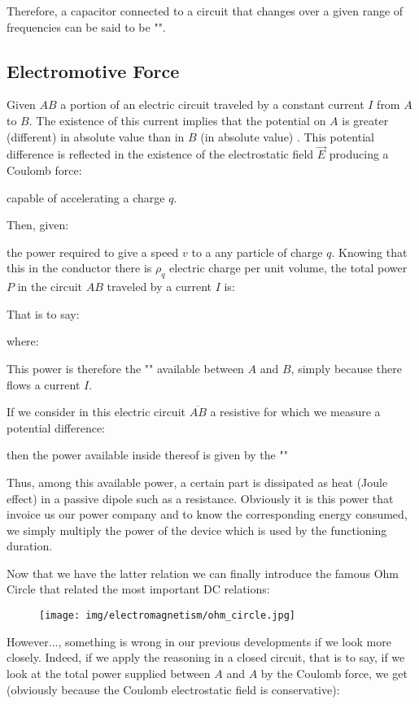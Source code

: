	Therefore, a capacitor connected to a circuit that changes over a given range of frequencies can be said to be "".
	
	\pagebreak
	\subsection{Electromotive Force}\label{electromotive force}
	Given $AB$ a portion of an electric circuit traveled by a constant current $I$ from $A$ to $B$. The existence of this current implies that the potential on $A$ is greater (different) in absolute value than in $B$ (in absolute value) . This potential difference is reflected in the existence of the electrostatic field $\vec{E}$ producing a Coulomb force:
	
	capable of accelerating a charge $q$.

	Then, given:
	
	the power required to give a speed $v$ to a any particle of charge $q$. Knowing that this in the conductor there is $\rho_q$ electric charge per unit volume, the total power $P$ in the circuit $AB$ traveled by a current $I$ is:
	
	That is to say:
	
	where:
	
	This power is therefore the "\label{electric power}" available between $A$ and $B$, simply because there flows a current $I$.

	If we consider in this electric circuit $\overline{AB}$ a resistive for which we measure a potential difference:
	
	then the power available inside thereof is given by the ""
	
	Thus, among this available power, a certain part is dissipated as heat (Joule effect) in a passive dipole such as a resistance. Obviously it is this power that invoice us our power company and to know the corresponding energy consumed, we simply multiply the power of the device which is used by the functioning duration.
	
	Now that we have the latter relation we can finally introduce the famous Ohm Circle that related the most important DC relations:
	\begin{figure}[H]
		\centering
		\texttt{[image: img/electromagnetism/ohm\_circle.jpg]}
	\end{figure}
	However..., something is wrong in our previous developments if we look more closely. Indeed, if we apply the reasoning in a closed circuit, that is to say, if we look at the total power supplied between $A$ and $A$ by the Coulomb force, we get (obviously because the Coulomb electrostatic field is conservative):
	
